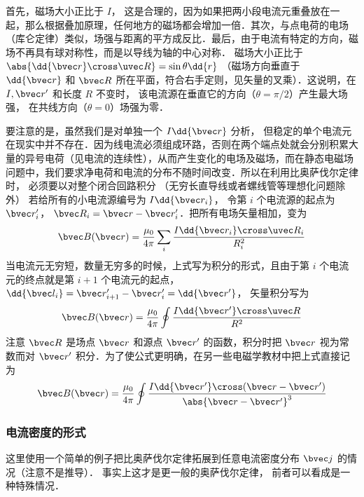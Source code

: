 首先，磁场大小正比于 $I$， 这是合理的，因为如果把两小段电流元重叠放在一起，那么根据叠加原理，任何地方的磁场都会增加一倍．其次，与点电荷的电场（库仑定律）类似，场强与距离的平方成反比．最后，由于电流有特定的方向，磁场不再具有球对称性，而是以导线为轴的中心对称． 磁场大小正比于 $\abs{\dd{\bvec r} \cross \uvec R} = \sin\theta \dd{r}$ （磁场方向垂直于 $\dd{\bvec r}$ 和 $\bvec R$ 所在平面，符合右手定则，见矢量的叉乘）．这说明，在 $I, \bvec r'$ 和长度 $R$ 不变时， 该电流源在垂直它的方向（$\theta  = \pi /2$）产生最大场强， 在共线方向（$\theta  = 0$）场强为零．

要注意的是，虽然我们是对单独一个 $I\dd{\bvec r}$ 分析， 但稳定的单个电流元在现实中并不存在．因为线电流必须组成环路，否则在两个端点处就会分别积累大量的异号电荷（见电流的连续性），从而产生变化的电场及磁场，而在静态电磁场问题中，我们要求净电荷和电流的分布不随时间改变．所以在利用比奥萨伐尔定律时， 必须要以对整个闭合回路积分 （无穷长直导线或者螺线管等理想化问题除外）%
若给所有的小电流源编号为 $I\dd{\bvec r_i}$， 令第 $i$ 个电流源的起点为 $\bvec r'_i$， $\bvec R_i = \bvec r - \bvec r'_i$．把所有电场矢量相加，变为
\begin{equation}
\bvec B (\bvec r) = \frac{\mu_0}{4\pi} \sum\limits_i \frac{I \dd{\bvec r_i} \cross \uvec R_i}{R_i^2}
\end{equation}
当电流元无穷短，数量无穷多的时候，上式写为积分的形式，且由于第 $i$ 个电流元的终点就是第 $i+1$ 个电流元的起点， $\dd{\bvec l_i} = \bvec r'_{i + 1} - \bvec r'_i = \dd{\bvec r'}$， 矢量积分写为
\begin{equation}\label{BioSav_eq4}
\bvec B (\bvec r) = \frac{\mu_0}{4\pi} \oint \frac{I\dd{\bvec r'} \cross \uvec R}{R^2}
\end{equation}
注意 $\bvec R$ 是场点 $\bvec r$ 和源点 $\bvec r'$ 的函数，积分时把 $\bvec r$ 视为常数而对 $\bvec r'$ 积分．为了使公式更明确，在另一些电磁学教材中把上式直接记为
\begin{equation}\label{BioSav_eq1}
\bvec B(\bvec r) = \frac{\mu_0}{4\pi} \oint \frac{I \dd{\bvec r'} \cross (\bvec r - \bvec r')}{\abs{\bvec r - \bvec r'}^3}
\end{equation}


\subsubsection{电流密度的形式}
这里使用一个简单的例子把比奥萨伐尔定律拓展到任意电流密度分布 $\bvec j$ 的情况（注意不是推导）． 事实上这才是更一般的奥萨伐尔定律， 前者可以看成是一种特殊情况．

